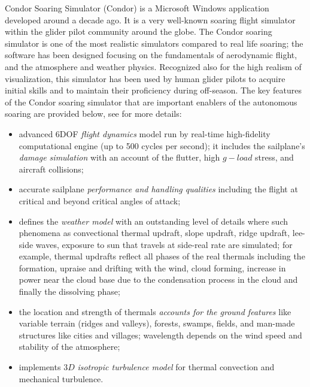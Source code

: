 \documentclass[letterpaper, 10 pt, conference]{ieeeconf}  %
\newcommand{\squeezeup}{\vspace{-1.0mm}}
\begin{document}
Condor Soaring Simulator (Condor) is a Microsoft Windows application developed around a decade ago. It is a very well-known soaring flight simulator within the glider pilot community around the globe. The Condor soaring simulator is one of the most realistic simulators compared to real life soaring; the software has been designed focusing on the fundamentals of aerodynamic flight, and the atmosphere and weather physics. Recognized also for the high realism of visualization, this simulator has been used by human glider pilots to acquire initial skills and to maintain their proficiency during off-season.
The key features of the Condor soaring simulator that are important enablers of the autonomous soaring are provided below, see \cite{Condor:2013:Online} for more details:
\squeezeup
\begin{itemize}
  \item advanced 6DOF \emph{flight dynamics} model run by real-time high-fidelity computational engine (up to 500 cycles per second); it includes the sailplane's \emph{damage simulation} with an account of the flutter, high $g-load$ stress, and aircraft collisions;
  \item accurate sailplane \emph{performance and handling qualities} including the flight at critical and beyond critical angles of attack;
  \item defines the \emph{weather model} with an outstanding level of details where such phenomena as convectional thermal updraft, slope updraft, ridge updraft, lee-side waves, exposure to sun that travels at side-real rate are simulated; for example, thermal updrafts reflect all phases of the real thermals including the formation, upraise and drifting with the wind, cloud forming, increase in power near the cloud base due to the condensation process in the cloud and finally the dissolving phase;
  \item the location and strength of thermals \emph{accounts for the ground features} like variable terrain (ridges and valleys), forests, swamps, fields, and man-made structures like cities and villages; wavelength depends on the wind speed and stability of the atmosphere;
  \item implements $3D$ \emph{isotropic turbulence model} for thermal convection and mechanical turbulence.
\end{itemize}
\end{document}
